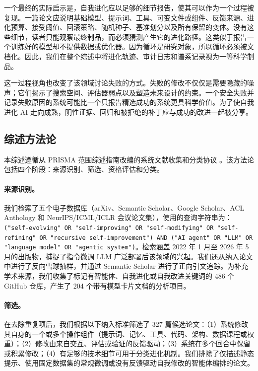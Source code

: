 一个最终的实际启示是，自我进化应以足够的细节报告，使其可以作为一个过程被复现。一篇论文应说明基础模型、提示词、工具、可变文件或组件、反馈来源、进化预算、接受阈值、回滚策略、随机种子、基准划分以及所有保留的变体。没有这些细节，读者只能观察最终制品，而必须猜测产生它的进化路径。这类似于报告一个训练好的模型却不提供数据或优化器。因为循环是研究对象，所以循环必须被文档化。因此，我们在整个综述中将进化轨迹、审计日志和谱系记录视为一等科学制品。

这一过程视角也改变了该领域讨论失败的方式。失败的修改不仅仅是需要隐藏的噪声；它们揭示了搜索空间、评估器弱点以及塑造未来设计的约束。一个安全失败并记录失败原因的系统可能比一个只报告精选成功的系统更具科学价值。为了使自我进化 AI 走向成熟，阴性证据、回归和被拒绝的补丁应与成功的改进一起被分享。

\subsection{综述方法论}
\label{subsec:intro-methodology}

本综述遵循从 PRISMA 范围综述指南改编的系统文献收集和分类协议 \cite{moher2009preferred}。该方法论包括四个阶段：来源识别、筛选、资格评估和分类。

\paragraph{来源识别。} 我们检索了五个电子数据库（arXiv、Semantic Scholar、Google Scholar、ACL Anthology 和 NeurIPS/ICML/ICLR 会议论文集），使用的查询字符串为：\texttt{("self-evolving" OR "self-improving" OR "self-modifying" OR "self-refining" OR "recursive self-improvement") AND ("AI agent" OR "LLM" OR "language model" OR "agentic system")}。检索涵盖 2022 年 1 月至 2026 年 5 月的出版物，捕捉了指令微调 LLM 广泛部署后该领域的兴起。我们还从纳入论文中进行了反向雪球抽样，并通过 Semantic Scholar 进行了正向引文追踪。为补充学术来源，我们收集了标记有智能体、自我进化或自我改进关键词的 486 个 GitHub 仓库，产生了 204 个带有模型卡片文档的分析项目。

\paragraph{筛选。} 在去除重复项后，我们根据以下纳入标准筛选了 327 篇候选论文：（1）系统修改其自身的一个或多个操作组件（提示词、记忆、工具、代码、架构、数据课程或权重）；（2）修改由来自交互、评估或验证的反馈驱动；（3）系统在多个回合中保留或积累修改；（4）有足够的技术细节可用于分类进化机制。我们排除了仅描述静态提示、使用固定数据集的常规微调或没有反馈驱动自我修改的智能体编排的论文。

